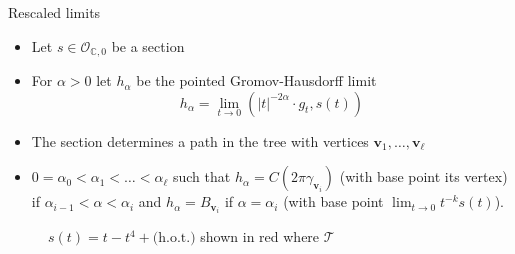 \documentclass{beamer}
\newcommand{\C}{\mathbb{C}}
\begin{document}
\begin{frame}{Rescaled limits}
	\begin{itemize}
		\item Let \(s \in \mathcal{O}_{\C, 0}\) be a section
		\item For \(\alpha>0\) let \(h_{\alpha}\) be the pointed Gromov-Hausdorff limit 
		\[h_{\alpha} = \lim_{t \to 0} (|t|^{-2\alpha} \cdot g_t, s(t))\]
		\item The section determines a path in the tree with vertices \(\mathbf{v}_1, \ldots, \mathbf{v}_{\ell}\)
		\item  \(0= \alpha_0 < \alpha_1 < \ldots < \alpha_{\ell}\) such that \(h_{\alpha} = C(2\pi \gamma_{\mathbf{v}_i})\) (with base point its vertex) if \(\alpha_{i-1} < \alpha < \alpha_i\) and \(h_{\alpha} = B_{\mathbf{v}_i}\) if \(\alpha=\alpha_i\) (with base point \(\lim_{t \to 0} t^{-k}s(t)\)).
	\end{itemize}
	
	\begin{figure}[h]
		\centering
		\caption{$s(t) = t - t^4 + \text{(h.o.t.)}$ shown in red where \(\mathcal{T}\)}
		\label{fig:polytreepath}
	\end{figure}
	
\end{frame}
\end{document}

